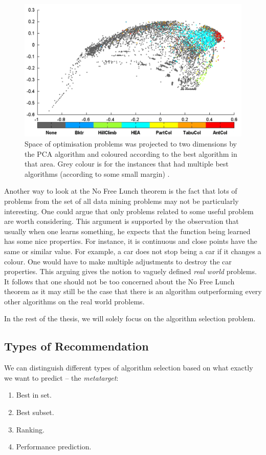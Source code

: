 \begin{figure}
	\includegraphics[width=14cm]{Images/smithMilesDominatedSpace.png}
	\centering
	\caption{Space of optimisation problems was projected to two dimensions by the PCA algorithm and coloured according to the best algorithm in that area. Grey colour is for the instances that had multiple best algorithms (according to some small margin) \cite{SmithMilesTowardsMeasuresOfAlgorithmPerformance}.}
	\label{fig:smithMilesDominatedSpace}	
\end{figure}


Another way to look at the No Free Lunch theorem is the fact that lots of problems from the set of all data mining problems may not be particularly interesting. One could argue that only problems related to some useful problem are worth considering. This argument is supported by the observation that usually when one learns something, he expects that the function being learned has some nice properties. For instance, it is continuous and close points have the same or similar value. For example, a car does not stop being a car if it changes a colour. One would have to make multiple adjustments to destroy the car properties. This arguing gives the notion to vaguely defined \emph{real world} problems. It follows that one should not be too concerned about the No Free Lunch theorem as it may still be the case that there is an algorithm outperforming every other algorithms on the real world problems.

In the rest of the thesis, we will solely focus on the algorithm selection problem.

\subsection{Types of Recommendation}
We can distinguish different types of algorithm selection \cite{BrazdilMetalearning-2009} based on what exactly we want to predict -- the \emph{metatarget}:
\begin{enumerate}
	\item Best in set.
	\item Best subset.
	\item Ranking.
	\item Performance prediction.
\end{enumerate}


